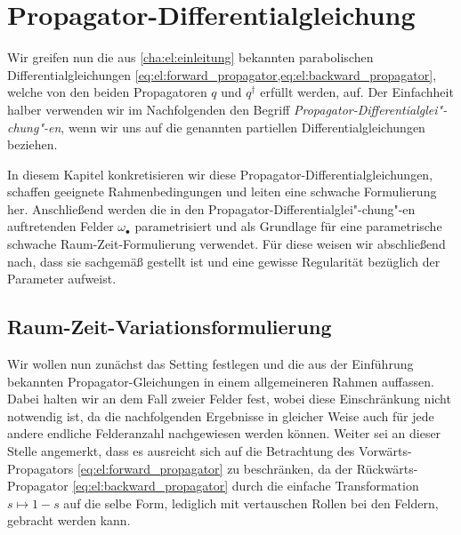 
\iftoggle{dictum}{
    \setchapterpreamble[ul][0.6\textwidth]{%
        \dictum[Andy Weir, \textit{The Martian}]{\enquote{I guess you could call it a \enquote{failure}, but I prefer the term \enquote{learning
        experience}.}}
        \vspace*{2\baselineskip}
    }
}{}
\chapter{Propagator-Differentialgleichung} %
\label{cha:ps:problemstellung}

Wir greifen nun die aus \cref{cha:el:einleitung} bekannten parabolischen Differentialgleichungen \cref{eq:el:forward_propagator,eq:el:backward_propagator}, welche von den beiden Propagatoren $q$ und $q^{\dagger}$ erfüllt werden, auf.
Der Einfachheit halber verwenden wir im Nachfolgenden den Begriff \emph{Propagator-Differentialglei"-chung"-en}, wenn wir uns auf die genannten partiellen Differentialgleichungen beziehen.

In diesem Kapitel konkretisieren wir diese Propagator-Differentialgleichungen, schaffen geeignete Rahmenbedingungen und leiten eine schwache Formulierung her.
Anschließend werden die in den Propagator-Differentialglei"-chung"-en auftretenden Felder $\omega_{\bullet}$ parametrisiert und als Grundlage für eine parametrische schwache Raum-Zeit-Formulierung verwendet.
Für diese weisen wir abschließend nach, dass sie sachgemäß gestellt ist und eine gewisse Regularität bezüglich der Parameter aufweist.

\section{Raum-Zeit-Variationsformulierung} %
\label{sub:ps:rzvp:raum_zeit_variationsformulierung}


Wir wollen nun zunächst das Setting festlegen und die aus der Einführung bekannten Propagator-Gleichungen in einem allgemeineren Rahmen auffassen.
Dabei halten wir an dem Fall zweier Felder fest, wobei diese Einschränkung nicht notwendig ist, da die nachfolgenden Ergebnisse in gleicher Weise auch für jede andere endliche Felderanzahl nachgewiesen werden können.
Weiter sei an dieser Stelle angemerkt, dass es ausreicht sich auf die Betrachtung des Vorwärts-Propagators \cref{eq:el:forward_propagator} zu beschränken, da der Rückwärts-Propagator \cref{eq:el:backward_propagator} durch die einfache Transformation $s \mapsto 1 - s$ auf die selbe Form, lediglich mit vertauschen Rollen bei den Feldern, gebracht werden kann.

